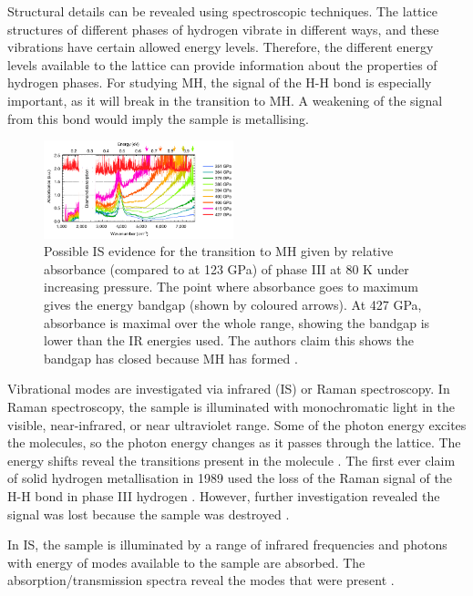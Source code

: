 \documentclass[esp]{FCEFyN-class}
\begin{document}
Structural details can be revealed using spectroscopic techniques. The lattice structures of different phases of hydrogen vibrate in different ways, and these vibrations have certain allowed energy levels. Therefore, the different energy levels available to the lattice can provide information about the properties of hydrogen phases. For studying MH, the signal of the H-H bond is especially important, as it will break in the transition to MH. A weakening of the signal from this bond would imply the sample is metallising.

\begin{figure}[H]
\centering
\includegraphics[width=0.49\textwidth]{Loubeyre2a.pdf}
\caption{\label{fig:IR_Loubeyre} Possible IS evidence for the transition to MH given by relative absorbance (compared to at 123 GPa) of phase III at 80 K under increasing pressure. The point where absorbance goes to maximum gives the energy bandgap (shown by coloured arrows). At 427 GPa, absorbance is maximal over the whole range, showing the bandgap is lower than the IR energies used. The authors claim this shows the bandgap has closed because MH has formed \cite{loubeyre2020}.}
\end{figure}
\vspace{3mm} %
Vibrational modes are investigated via infrared (IS) or Raman spectroscopy. In Raman spectroscopy, the sample is illuminated with monochromatic light in the visible, near-infrared, or near ultraviolet range. Some of the photon energy excites the molecules, so the photon energy changes as it passes through the lattice. The energy shifts reveal the transitions present in the molecule \cite{Nave2017Raman}. The first ever claim of solid hydrogen metallisation in 1989 used the loss of the Raman signal of the H-H bond in phase III hydrogen \cite{hemley1989}. However, further investigation  revealed the signal was lost because the sample was destroyed \cite{gregoryanz2020}.

In IS, the sample is illuminated by a range of infrared frequencies and photons with energy of modes available to the sample are absorbed. The absorption/transmission spectra reveal the modes that were present \cite{Brighthub}.
\end{document}
